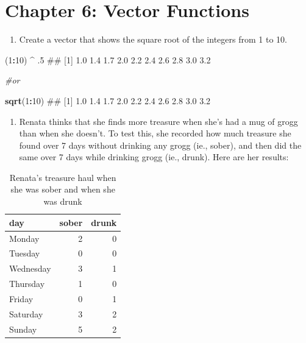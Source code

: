 \documentclass[]{book}
\newenvironment{Shaded}{\begin{snugshade}}{\end{snugshade}}
\newcommand{\KeywordTok}[1]{\textcolor[rgb]{0.13,0.29,0.53}{\textbf{#1}}}
\newcommand{\DecValTok}[1]{\textcolor[rgb]{0.00,0.00,0.81}{#1}}
\newcommand{\StringTok}[1]{\textcolor[rgb]{0.31,0.60,0.02}{#1}}
\newcommand{\CommentTok}[1]{\textcolor[rgb]{0.56,0.35,0.01}{\textit{#1}}}
\newcommand{\OperatorTok}[1]{\textcolor[rgb]{0.81,0.36,0.00}{\textbf{#1}}}
\newcommand{\NormalTok}[1]{#1}
\providecommand{\tightlist}{%
  \setlength{\itemsep}{0pt}\setlength{\parskip}{0pt}}
\theoremstyle{definition}
\theoremstyle{definition}
\theoremstyle{remark}
\begin{document}
\section{Chapter 6: Vector Functions}\label{chapter-6-vector-functions}

\begin{enumerate}
\def\labelenumi{\arabic{enumi}.}
\tightlist
\item
  Create a vector that shows the square root of the integers from 1 to
  10.
\end{enumerate}

\begin{Shaded}
\begin{Highlighting}[]
\NormalTok{(}\DecValTok{1}\OperatorTok{:}\DecValTok{10}\NormalTok{) }\OperatorTok{^}\StringTok{ }\NormalTok{.}\DecValTok{5}
\NormalTok{##  [1] 1.0 1.4 1.7 2.0 2.2 2.4 2.6 2.8 3.0 3.2}

\CommentTok{#or}

\KeywordTok{sqrt}\NormalTok{(}\DecValTok{1}\OperatorTok{:}\DecValTok{10}\NormalTok{)}
\NormalTok{##  [1] 1.0 1.4 1.7 2.0 2.2 2.4 2.6 2.8 3.0 3.2}
\end{Highlighting}
\end{Shaded}

\begin{enumerate}
\def\labelenumi{\arabic{enumi}.}
\setcounter{enumi}{1}
\tightlist
\item
  Renata thinks that she finds more treasure when she's had a mug of
  grogg than when she doesn't. To test this, she recorded how much
  treasure she found over 7 days without drinking any grogg (ie.,
  sober), and then did the same over 7 days while drinking grogg (ie.,
  drunk). Here are her results:
\end{enumerate}

\begin{table}

\caption{\label{tab:unnamed-chunk-512}Renata's treasure haul when she was sober and when she was drunk}
\centering
\begin{tabular}[t]{l|r|r}
\hline
day & sober & drunk\\
\hline
Monday & 2 & 0\\
\hline
Tuesday & 0 & 0\\
\hline
Wednesday & 3 & 1\\
\hline
Thursday & 1 & 0\\
\hline
Friday & 0 & 1\\
\hline
Saturday & 3 & 2\\
\hline
Sunday & 5 & 2\\
\hline
\end{tabular}
\end{table}
\end{document}
